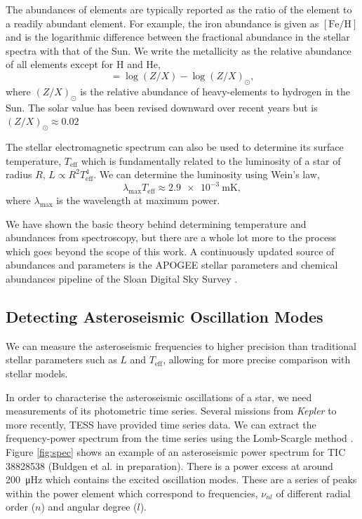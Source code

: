 The abundances of elements are typically reported as the ratio of the element to a readily abundant element. For example, the iron abundance is given as $[\mathrm{Fe/H}]$ and is the logarithmic difference between the fractional abundance in the stellar spectra with that of the Sun. We write the metallicity as the relative abundance of all elements except for H and He,
\begin{equation}
    [\mathrm{M/H}] = \log(Z/X) - \log(Z/X)_\odot,
\end{equation}
where $(Z/X)_\odot$ is the relative abundance of heavy-elements to hydrogen in the Sun. The solar value has been revised downward over recent years but is $(Z/X)_\odot \approx 0.02$ \citep{Grevesse.Sauval1998, Asplund.Grevesse.ea2005, Asplund.Grevesse.ea2009}

The stellar electromagnetic spectrum can also be used to determine its surface temperature, $T_\mathrm{eff}$ which is fundamentally related to the luminosity of a star of radius $R$, $L \propto R^2T_\mathrm{eff}^4$. We can determine the luminosity using Wein's law,
\begin{equation}
    \lambda_\mathrm{max} T_\mathrm{eff} \approx \SI{2.9e-3}{\meter\kelvin},
\end{equation}
where $\lambda_\mathrm{max}$ is the wavelength at maximum power.

We have shown the basic theory behind determining temperature and abundances from spectroscopy, but there are a whole lot more to the process which goes beyond the scope of this work. A continuously updated source of abundances and parameters is the APOGEE stellar parameters and chemical abundances pipeline \citep[ASPCAP;][]{GarciaPerez.AllendePrieto.ea2016} of the Sloan Digital Sky Survey \citep[SDSS;][]{Blanton.Bershady.ea2017}.

\subsection{Detecting Asteroseismic Oscillation Modes}\label{sec:astero-obs}

We can measure the asteroseismic frequencies to higher precision than traditional stellar parameters such as $L$ and $T_\mathrm{eff}$, allowing for more precise comparison with stellar models.

In order to characterise the asteroseismic oscillations of a star, we need measurements of its photometric time series. Several missions from \emph{Kepler} \citep{Borucki.Koch.ea2010} to more recently, TESS \citep{Ricker.Winn.ea2015} have provided time series data. We can extract the frequency-power spectrum from the time series using the Lomb-Scargle method \citep{Lomb1976, Scargle1982}. Figure \ref{fig:spec} shows an example of an asteroseismic power spectrum for TIC 38828538 (Buldgen et al. in preparation). There is a power excess at around \SI{200}{\micro\hertz} which contains the excited oscillation modes. These are a series of peaks within the power element which correspond to frequencies, $\nu_{nl}$ of different radial order ($n$) and angular degree ($l$).

